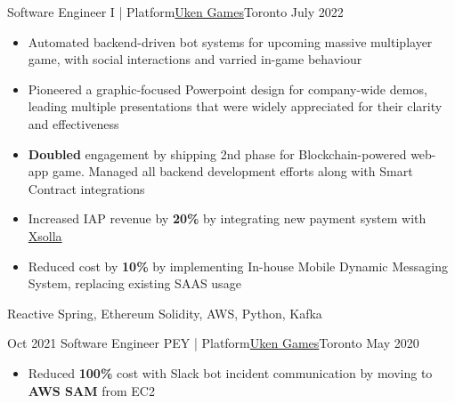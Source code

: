 %
%
%
\begin{experiences}
  \experienceCurrent
    {Software Engineer I | Platform}{\href{https://uken.com}{Uken Games}}{Toronto}
    {July 2022} {
                    \begin{itemize}
                        \setlength\itemsep{0.6em}
                        \item Automated backend-driven bot systems for upcoming massive multiplayer game, with social interactions and varried in-game behaviour

                        \item Pioneered a graphic-focused Powerpoint design for company-wide demos, leading multiple presentations that were widely appreciated for their clarity and effectiveness

                        \item \textbf{Doubled} engagement by shipping 2nd phase for Blockchain-powered web-app game. Managed all backend development efforts along with Smart Contract integrations

                        \item Increased IAP revenue by \textbf{20\%} by integrating new payment system with \href{https://xsolla.com}{Xsolla} 

                        \item Reduced cost by \textbf{10\%} by implementing In-house Mobile Dynamic Messaging System, replacing existing SAAS usage
                    \end{itemize}
                    }
                    {Reactive Spring, Ethereum Solidity, AWS, Python, Kafka}

  \emptySeparator
  \experience
    {Oct 2021}   {Software Engineer PEY | Platform}{\href{https://uken.com}{Uken Games}}{Toronto}
    {May 2020} {
                    \begin{itemize}
                        \setlength\itemsep{0.6em}
                        \item Reduced \textbf{100\%} cost with Slack bot incident communication by moving to \textbf{AWS SAM} from EC2
                        

\end{itemize}}
\end{experiences}

